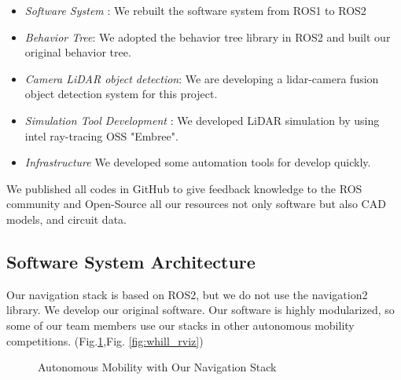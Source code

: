 \documentclass[lettersize,journal]{IEEEtran}
\begin{document}
\begin{itemize}
  \item {\it Software System }:
    We rebuilt the software system from ROS1 to ROS2
  \item {\it Behavior Tree}:
  We adopted the behavior tree library in ROS2 and built our original behavior tree.  
  \item {\it Camera LiDAR object detection}:
    We are developing a lidar-camera fusion object detection system for this project.
  \item {\it Simulation Tool Development }:
    We developed LiDAR simulation by using intel ray-tracing OSS "Embree".
  \item {\it Infrastructure}
    We developed some automation tools for develop quickly.
\end{itemize}
We published all codes in GitHub to give feedback knowledge to the ROS community and 
Open-Source all our resources not only software \cite{documentation_software}
but also CAD models, and circuit data. \cite{documentation_hardware}

\subsection{Software System Architecture}
Our navigation stack is based on ROS2, but we do not use the navigation2 library. We develop our original software.
Our software is highly modularized, so some of our team members use our stacks in other autonomous mobility competitions. 
(Fig.\ref{fig:whill},Fig. \ref{fig:whill_rviz})

\begin{figure}[H]
    \begin{center}
    \end{center}
    \caption{Autonomous Mobility with Our Navigation Stack}
    \label{fig:whill}
\end{figure}
\end{document}
